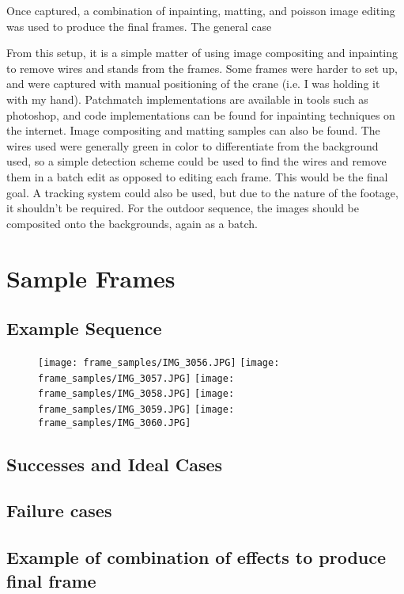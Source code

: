 \documentclass[12pt]{article}
\begin{document}
        Once captured, a combination of inpainting, matting, and poisson image editing was used to produce the final frames.  The general case 
		
		From this setup, it is a simple matter of using image compositing and inpainting to remove wires and stands from the frames.  Some frames were harder to set up, and were captured with manual positioning of the crane (i.e. I was holding it with my hand).  Patchmatch implementations are available in tools such as photoshop, and code implementations can be found for inpainting techniques on the internet.  Image compositing and matting samples can also be found.  The wires used were generally green in color to differentiate from the background used, so a simple detection scheme could be used to find the wires and remove them in a batch edit as opposed to editing each frame.  This would be the final goal.  A tracking system could also be used, but due to the nature of the footage, it shouldn't be required.  For the outdoor sequence, the images should be composited onto the backgrounds, again as a batch.
		
	\section{Sample Frames}
        \subsection{Example Sequence}
            \begin{figure}[H]
                \centering
                \texttt{[image: frame\_samples/IMG\_3056.JPG]}
                \texttt{[image: frame\_samples/IMG\_3057.JPG]}
                \texttt{[image: frame\_samples/IMG\_3058.JPG]}
                \texttt{[image: frame\_samples/IMG\_3059.JPG]}
                \texttt{[image: frame\_samples/IMG\_3060.JPG]}
            \end{figure}
        \subsection{Successes and Ideal Cases}
            
        \subsection{Failure cases}
        \subsection{Example of combination of effects to produce final frame}
\end{document}
